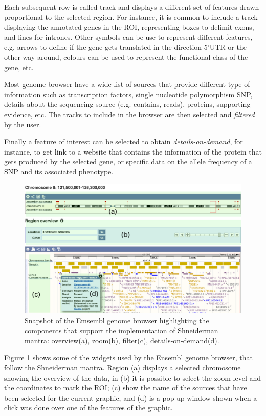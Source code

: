 Each subsequent row is called track and displays a different set of features drawn proportional to the selected region. For instance, it is common to include a track displaying the annotated genes in the ROI, representing boxes to delimit exons, and lines for intrones. Other symbols can be use to represent different features, e.g. arrows to define if the gene gets translated in the direction 5'UTR or the other way around, colours can be used to represent the functional class of the gene, etc.

Most genome browser have a wide list of sources that provide different type of information such as transcription factors, single nucleotide polymorphism SNP, details about the sequencing source (e.g. contains, reads), proteins, supporting evidence, etc. The tracks to include in the browser are then selected and \emph{filtered} by the user. 

Finally a feature of interest can be selected to obtain \emph{details-on-demand}, for instance, to get link to a website that contains the information of the protein that gets produced by the selected gene, or specific data on the allele frequency of a SNP and its associated phenotype.

\begin{figure}  
\centering
\includegraphics[width=\textwidth]{figures/ensembl_snapshot.png}
\caption[Snapshot of the Emsembl genome browser.]{Snapshot of the Emsembl genome browser highlighting the components that support the implementation of Shneiderman mantra: overview(a), zoom(b), filter(c), details-on-demand(d).
\label{fig:ensembl_sn}}
\end{figure}

Figure \ref{fig:ensembl_sn} shows some of the widgets used by the Ensembl genome browser, that follow the Shneiderman mantra. Region (a) displays a selected chromosome showing the overview of the data, in (b) it is possible to select the zoom level and the coordinates to mark the ROI; (c) show the name of the sources that have been selected for the current graphic, and (d) is a pop-up window shown when a click was done over one of the features of the graphic.

